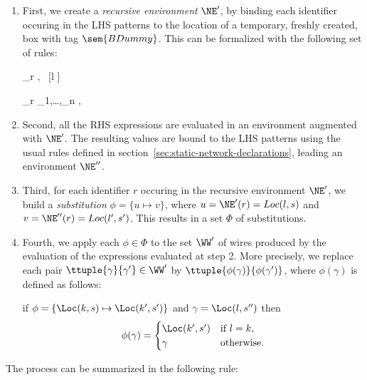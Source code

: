\begin{enumerate}
\item First, we create a \emph{recursive environment} $\NE'$, by binding each identifier occuring in
  the LHS patterns to the location of a temporary, freshly created, box with tag $\sem{BDummy}$. This
  can be formalized with the following set of rules:


{\vdash_r \id {},~ [l \mapsto {}]}

{\vdash_r \tm{(}_1,\ldots,_n\tm{)} \gives {},~}

\item Second, all the RHS expressions are evaluated in an environment augmented with $\NE'$. The
resulting values are bound to the LHS patterns using the usual rules defined in
section~\ref{sec:static-network-declarations}, leading an environment $\NE''$.

\item Third, for each identifier $r$ occuring in the recursive environment $\NE'$, we build a
\emph{substitution} $\phi = \lbrace u \mapsto v \rbrace$, where $u=\NE'(r)=Loc(l,s)$ and
$v=\NE''(r)=Loc(l',s')$. This results in a set $\Phi$ of substitutions.

\item Fourth, we apply each $\phi \in \Phi$ to the set $\WW'$ of wires produced by the evaluation of
  the expressions evaluated at step 2. More precisely, we replace each pair $\ttuple{\gamma}{\gamma'} \in \WW'$ by
$\ttuple{\phi(\gamma)}{\phi(\gamma')}$, where $\phi(\gamma)$ is defined as follows:

if $\phi = \lbrace \Loc(k,s) \mapsto \Loc(k',s') \rbrace$ and $\gamma=\Loc(l,s'')$ then
\begin{equation}
\phi(\gamma) =
\begin{cases}
\Loc(k',s') & \text{if } l=k, \\
\gamma & \text{otherwise}.
\end{cases}
\end{equation}
\end{enumerate}

The process can be summarized in the following rule:

